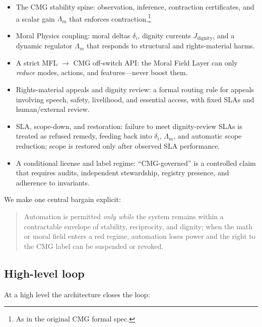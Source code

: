 \documentclass[11pt]{article}
\begin{document}
\begin{itemize}[leftmargin=*]
  \item The CMG stability spine: observation, inference, contraction certificates, and a scalar gain \(\Lambda_m\) that enforces contraction.\footnote{As in the original CMG formal spec.}
  \item Moral Physics coupling: moral deltas \(\delta_i\), dignity currents \(J_{\text{dignity}}\), and a dynamic regulator \(\Lambda_m\) that responds to structural and rights-material harms.
  \item A strict MFL \(\rightarrow\) CMG off-switch API: the Moral Field Layer can only \emph{reduce} modes, actions, and features---never boost them.
  \item Rights-material appeals and dignity review: a formal routing rule for appeals involving speech, safety, livelihood, and essential access, with fixed SLAs and human/external review.
  \item SLA, scope-down, and restoration: failure to meet dignity-review SLAs is treated as refused remedy, feeding back into \(\delta_i\), \(\Lambda_m\), and automatic scope reduction; scope is restored only after observed SLA performance.
  \item A conditional license and label regime: ``CMG-governed'' is a controlled claim that requires audits, independent stewardship, registry presence, and adherence to invariants.
\end{itemize}

We make one central bargain explicit:

\begin{quote}
Automation is permitted \emph{only while} the system remains within a contractable envelope of stability, reciprocity, and dignity; when the math or moral field enters a red regime, automation loses power and the right to the CMG label can be suspended or revoked.
\end{quote}

\subsection{High-level loop}

At a high level the architecture closes the loop:
\end{document}
